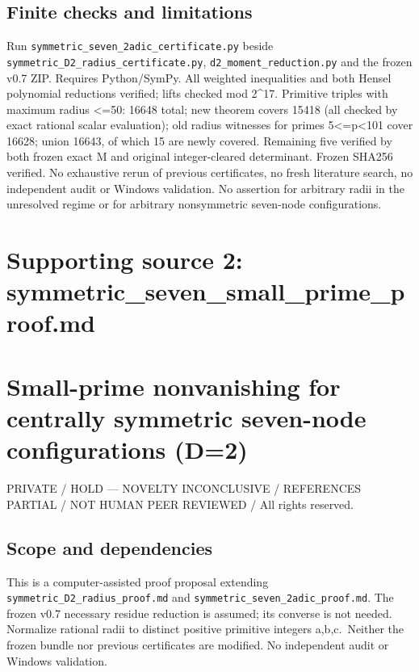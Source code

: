 \documentclass[
  10pt,
]{article}
\begin{document}
\subsection{Finite checks and
limitations}\label{finite-checks-and-limitations}

Run \texttt{symmetric\_seven\_2adic\_certificate.py} beside
\texttt{symmetric\_D2\_radius\_certificate.py},
\texttt{d2\_moment\_reduction.py} and the frozen v0.7 ZIP. Requires
Python/SymPy. All weighted inequalities and both Hensel polynomial
reductions verified; lifts checked mod 2\^{}17. Primitive triples with
maximum radius \textless=50: 16648 total; new theorem covers 15418 (all
checked by exact rational scalar evaluation); old radius witnesses for
primes 5\textless=p\textless101 cover 16628; union 16643, of which 15
are newly covered. Remaining five verified by both frozen exact M and
original integer-cleared determinant. Frozen SHA256 verified. No
exhaustive rerun of previous certificates, no fresh literature search,
no independent audit or Windows validation. No assertion for arbitrary
radii in the unresolved regime or for arbitrary nonsymmetric seven-node
configurations.

\newpage

\section{Supporting source 2:
symmetric\_seven\_small\_prime\_proof.md}\label{supporting-source-2-symmetric_seven_small_prime_proof.md}

\section{Small-prime nonvanishing for centrally symmetric seven-node
configurations
(D=2)}\label{small-prime-nonvanishing-for-centrally-symmetric-seven-node-configurations-d2}

PRIVATE / HOLD --- NOVELTY INCONCLUSIVE / REFERENCES PARTIAL / NOT HUMAN
PEER REVIEWED / All rights reserved.

\subsection{Scope and dependencies}\label{scope-and-dependencies}

This is a computer-assisted proof proposal extending
\texttt{symmetric\_D2\_radius\_proof.md} and
\texttt{symmetric\_seven\_2adic\_proof.md}. The frozen v0.7 necessary
residue reduction is assumed; its converse is not needed. Normalize
rational radii to distinct positive primitive integers a,b,c.~Neither
the frozen bundle nor previous certificates are modified. No independent
audit or Windows validation.
\end{document}

